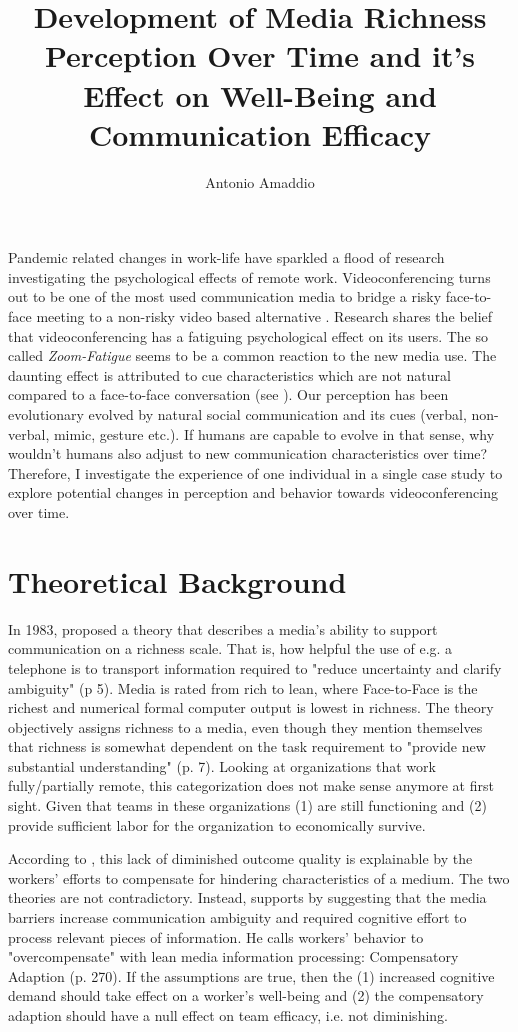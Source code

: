 \documentclass[man]{apa7}
\title{Development of Media Richness Perception Over Time and it's Effect on Well-Being and Communication Efficacy}
\author{Antonio Amaddio}
\affiliation{Freie Universität Berlin \\ A\&O Vertiefung, Winter 2022/23, Supervisor: Dr. Lisa Handke}
\begin{document}
\maketitle
Pandemic related changes in work-life have sparkled a flood of research investigating the psychological effects of remote work. Videoconferencing turns out to be one of the most used communication media to bridge a risky face-to-face meeting to a non-risky video based alternative \parencite{Riedl2021}.  Research shares the belief that videoconferencing has a fatiguing psychological effect on its users. The so called \textit{Zoom-Fatigue} seems to be a common reaction to the new media use. The daunting effect is attributed to cue characteristics which are not natural compared to a face-to-face conversation (see \cite{Riedl2021}). Our perception has been evolutionary evolved by natural social communication and its cues (verbal, non-verbal, mimic, gesture etc.). If humans are capable to evolve in that sense, why wouldn't humans also adjust to new communication characteristics over time? Therefore, I investigate the experience of one individual in a single case study to explore potential changes in perception and behavior towards videoconferencing over time.

\section{Theoretical Background}

In 1983, \citeauthor{daft1983information} proposed a theory that describes a media's ability to support communication on a richness scale. That is, how helpful the use of e.g. a telephone is to transport information required to "reduce uncertainty and clarify ambiguity" (p 5). Media is rated from rich to lean, where Face-to-Face is the richest and numerical formal computer output is lowest in richness. The theory objectively assigns richness to a media, even though they mention themselves that richness is somewhat dependent on the task requirement to "provide new substantial understanding" (p. 7). Looking at organizations that work fully/partially remote, this categorization does not make sense anymore at first sight. Given that teams in these organizations (1) are still functioning and (2) provide sufficient labor for the organization to economically survive.

According to \citeauthor{Kock2005}, this lack of diminished outcome quality is explainable by the workers' efforts to compensate for hindering characteristics of a medium. The two theories are not contradictory. Instead, \citeauthor{Kock2005} supports by suggesting that the media barriers increase communication ambiguity and required cognitive effort to process relevant pieces of information. He calls workers' behavior to "overcompensate" with lean media information processing: Compensatory Adaption (p. 270). If the assumptions are true, then the (1) increased cognitive demand should take effect on a worker's well-being and (2) the compensatory adaption should have a null effect on team efficacy, i.e. not diminishing.
\end{document}
